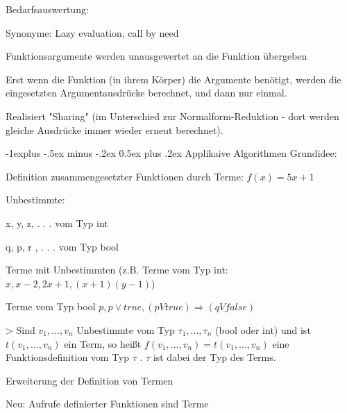 \documentclass[10pt]{article}
\makeatletter
\renewcommand{\subsection}{\@startsection{subsection}{2}{0mm}%
                                {-1explus -.5ex minus -.2ex}%
                                {0.5ex plus .2ex}%
                                {\normalfont\normalsize\bfseries}}
\makeatother
\begin{document}
\begin{itemize*}
\begin{itemize*}
\begin{itemize*}
\begin{itemize*}
    \end{itemize*}
    \item Bedarfsauswertung:
    \begin{itemize*}
      \item Synonyme: Lazy evaluation, call by need
      \item Funktionsargumente werden unausgewertet an die Funktion übergeben
      \item Erst wenn die Funktion (in ihrem Körper) die Argumente benötigt, werden die eingesetzten Argumentausdrücke berechnet, und dann nur einmal.
      \item Realisiert "Sharing" (im Unterschied zur Normalform-Reduktion - dort werden gleiche Ausdrücke immer wieder erneut berechnet).
    \end{itemize*}
  \end{itemize*}
\end{itemize*}

\subsection{Applikaive Algorithmen}
Grundidee:
\begin{itemize*}
  \item Definition zusammengesetzter Funktionen durch Terme: $f(x) = 5x + 1$
  \item Unbestimmte:
  \begin{itemize*}
    \item x, y, z, . . . vom Typ int
    \item q, p, r , . . . vom Typ bool
  \end{itemize*}
  \item Terme mit Unbestimmten (z.B. Terme vom Typ int: $x, x - 2, 2x + 1, (x + 1)(y - 1)$)
  \item Terme vom Typ bool $p, p \vee true, (p V true) \Rightarrow (q V false)$
\end{itemize*}

> Sind $v_1, ..., v_n$ Unbestimmte vom Typ $\tau_1,...,\tau_n$ (bool oder int) und ist $t(v_1, ..., v_n)$ ein Term, so heißt $f(v_1, ..., v_n) = t(v_1, ..., v_n)$ eine Funktionsdefinition vom Typ $\tau$ . $\tau$ ist dabei der Typ des Terms.

\begin{itemize*}
  \item Erweiterung der Definition von Termen
  \item Neu: Aufrufe definierter Funktionen sind Terme
\end{itemize*}


\end{itemize*}
\end{document}
